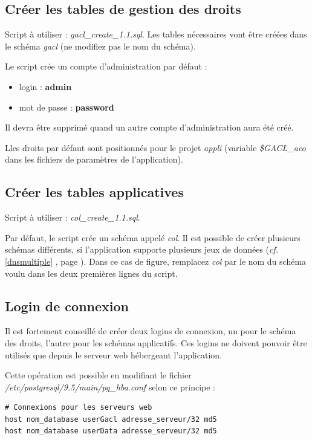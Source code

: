 \subsection{Créer les tables de gestion des droits}
Script à utiliser : \textit{gacl\_create\_1.1.sql}. Les tables nécessaires vont être créées dans le schéma \textit{gacl} (ne modifiez pas le nom du schéma).

Le script crée un compte d'administration par défaut :
\begin{itemize}
\item login : \textbf{admin}
\item mot de passe : \textbf{password}
\end{itemize}

Il devra être supprimé quand un autre compte d'administration aura été créé.

Lles droits par défaut sont positionnés pour le projet \textit{appli} (variable \textit{\$GACL\_aco} dans les fichiers de paramètres de l'application).


\subsection{Créer les tables applicatives}
Script à utiliser : \textit{col\_create\_1.1.sql}.

Par défaut, le script crée un schéma appelé \textit{col}. Il est possible de créer plusieurs schémas différents, si l'application supporte plusieurs jeux de données (\textit{cf.} \ref{dnsmultiple} \textit{}, page \pageref{dnsmultiple}). Dans ce cas de figure, remplacez \textit{col} par le nom du schéma voulu dans les deux premières lignes du script.

\subsection{Login de connexion}

Il est fortement conseillé de créer deux logins de connexion, un pour le schéma des droits, l'autre pour les schémas applicatifs. Ces logins ne doivent pouvoir être utilisés que depuis le serveur web hébergeant l'application.

Cette opération est possible en modifiant le fichier \textit{/etc/postgresql/9.5/main/pg\_hba.conf} selon ce principe :

\begin{lstlisting}
# Connexions pour les serveurs web 
host nom_database userGacl adresse_serveur/32 md5 
host nom_database userData adresse_serveur/32 md5
\end{lstlisting}

